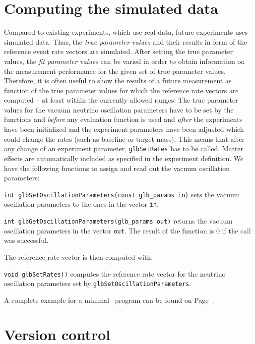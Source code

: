 \section{Computing the simulated data}

Compared to existing experiments, which use real data, future experiments
uses simulated data. Thus, the {\em true parameter values} and their results in form of the reference event rate vectors are simulated. After setting the true parameter values, the {\em fit parameter values} can be varied in order to obtain information on the measurement performance for the given set of true parameter values. Therefore, it is often useful to show the results of a future measurement as function of the true parameter values for which the reference rate vectors are computed -- at least within the currently allowed ranges. The true parameter values for the vacuum neutrino oscillation parameters have to be set by the functions  and  {\em before} any evaluation function is used and {\em after} the experiments have been initialized and the experiment parameters have been adjusted which could change the rates (such as baseline or target mass). This means that
after any change of an experiment parameter, {\tt glbSetRates} has to be called. Matter effects are automatically included as specified in the experiment definition. We have the following functions to assign and
read out the vacuum oscillation parameters:
\begin{function}
{\tt int glbSetOscillationParameters(const glb\_params in)} sets the
vacuum oscillation parameters to the ones in the vector {\tt in}.
\end{function}
\begin{function}
{\tt int glbGetOscillationParameters(glb\_params out)} returns the
vacuum oscillation parameters in the vector {\tt out}. The result of
the function is $0$ if the call was successful.
\end{function}
The reference rate vector is then computed with:
\begin{function}
{\tt void glbSetRates()} computes the reference rate vector for the neutrino oscillation parameters set by {\tt glbSetOscillationParameters}. 
\end{function}
A complete example for a minimal \GLOBES\ program can be found on
Page~\pageref{ex:c}.

\section{Version control}

